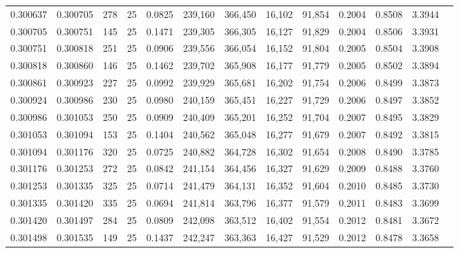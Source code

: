 \begin{tabular}{rrrrrrrrrrrrr}
0.300637 & 0.300705 &   278 &  25 &                                     0.0825 & 239,160 & 366,450 &  16,102 &  91,854 & 0.2004 & 0.8508 & 3.3944 \\
0.300705 & 0.300751 &   145 &  25 &                                     0.1471 & 239,305 & 366,305 &  16,127 &  91,829 & 0.2004 & 0.8506 & 3.3931 \\
0.300751 & 0.300818 &   251 &  25 &                                     0.0906 & 239,556 & 366,054 &  16,152 &  91,804 & 0.2005 & 0.8504 & 3.3908 \\
0.300818 & 0.300860 &   146 &  25 &                                     0.1462 & 239,702 & 365,908 &  16,177 &  91,779 & 0.2005 & 0.8502 & 3.3894 \\
0.300861 & 0.300923 &   227 &  25 &                                     0.0992 & 239,929 & 365,681 &  16,202 &  91,754 & 0.2006 & 0.8499 & 3.3873 \\
0.300924 & 0.300986 &   230 &  25 &                                     0.0980 & 240,159 & 365,451 &  16,227 &  91,729 & 0.2006 & 0.8497 & 3.3852 \\
0.300986 & 0.301053 &   250 &  25 &                                     0.0909 & 240,409 & 365,201 &  16,252 &  91,704 & 0.2007 & 0.8495 & 3.3829 \\
0.301053 & 0.301094 &   153 &  25 &                                     0.1404 & 240,562 & 365,048 &  16,277 &  91,679 & 0.2007 & 0.8492 & 3.3815 \\
0.301094 & 0.301176 &   320 &  25 &                                     0.0725 & 240,882 & 364,728 &  16,302 &  91,654 & 0.2008 & 0.8490 & 3.3785 \\
0.301176 & 0.301253 &   272 &  25 &                                     0.0842 & 241,154 & 364,456 &  16,327 &  91,629 & 0.2009 & 0.8488 & 3.3760 \\
0.301253 & 0.301335 &   325 &  25 &                                     0.0714 & 241,479 & 364,131 &  16,352 &  91,604 & 0.2010 & 0.8485 & 3.3730 \\
0.301335 & 0.301420 &   335 &  25 &                                     0.0694 & 241,814 & 363,796 &  16,377 &  91,579 & 0.2011 & 0.8483 & 3.3699 \\
0.301420 & 0.301497 &   284 &  25 &                                     0.0809 & 242,098 & 363,512 &  16,402 &  91,554 & 0.2012 & 0.8481 & 3.3672 \\
0.301498 & 0.301535 &   149 &  25 &                                     0.1437 & 242,247 & 363,363 &  16,427 &  91,529 & 0.2012 & 0.8478 & 3.3658 \\

\end{tabular}
